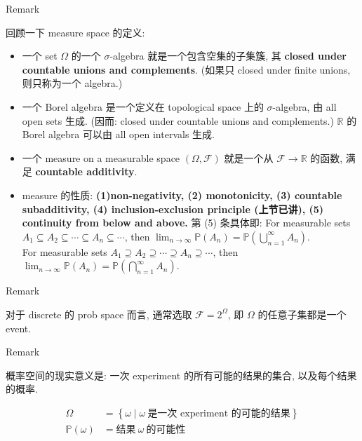 \begin{qlremark}{Remark}

回顾一下 measure space 的定义:

\begin{itemize}
\item
  一个 set \(\Omega\) 的一个 \(\mathit{\sigma}\)-algebra 就是一个包含空集的子集簇, 其 \textbf{closed under countable unions and complements}. (如果只 closed under finite unions, 则只称为一个 algebra.)
\item
  一个 Borel algebra 是一个定义在 topological space 上的 \(\mathit{\sigma}\)-algebra, 由 all open sets 生成. (因而: closed under countable unions and complements.) \(\mathbb{R}\) 的 Borel algebra 可以由 all open intervals 生成.
\item
  一个 measure on a measurable space \((\Omega,\mathcal{F})\) 就是一个从 \(\mathcal{F}\rightarrow\mathbb{R}\) 的函数, 满足 \textbf{countable additivity}.
\item
  measure 的性质: \textbf{(1)non-negativity, (2) monotonicity, (3) countable subadditivity, (4) inclusion-exclusion principle (上节已讲), (5) continuity from below and above.} 第 (5) 条具体即: For measurable sets \(\mathit{A}_{1} \subseteq \mathit{A}_{2} \subseteq \cdots \subseteq \mathit{A}_{\mathit{n}} \subseteq \cdots\), then \(\lim_{\mathit{n}\rightarrow\infty}\mathbb{P}(\mathit{A}_{\mathit{n}}) = \mathbb{P}(\bigcup_{\mathit{n} = 1}^{\infty}\mathit{A}_{\mathit{n}})\).\\
  For measurable sets \(\mathit{A}_{1} \supseteq \mathit{A}_{2} \supseteq \cdots \supseteq \mathit{A}_{\mathit{n}} \supseteq \cdots\), then \(\lim_{\mathit{n}\rightarrow\infty}\mathbb{P}(\mathit{A}_{\mathit{n}}) = \mathbb{P}(\bigcap_{\mathit{n} = 1}^{\infty}\mathit{A}_{\mathit{n}})\).
\end{itemize}

\end{qlremark}

\begin{qlremark}{Remark}

对于 discrete 的 prob space 而言, 通常选取 \(\mathcal{F} = 2^{\Omega}\), 即 \(\Omega\) 的任意子集都是一个 event.

\end{qlremark}

\begin{qlremark}{Remark}

概率空间的现实意义是: 一次 experiment 的所有可能的结果的集合, 以及每个结果的概率.

\[\begin{matrix}
\Omega & {= \left\{ {\mathit{\omega} \mid \mathit{\omega}\ \text{是一次 experiment 的可能的结果}} \right\}} \\
{\mathbb{P}(\mathit{\omega})} & {= \text{结果}\ \mathit{\omega}\ \text{的可能性}}
\end{matrix}\]

\end{qlremark}

